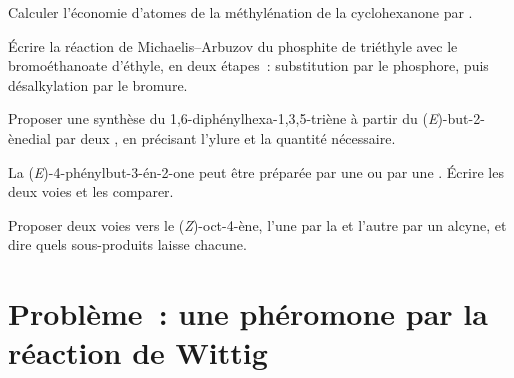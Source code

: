 \begin{exercise}[$\star\star$]\label{exo:b2:wittig:8}
Calculer l'économie d'atomes de la méthylénation de la cyclohexanone par .
\end{exercise}

\begin{exercise}[$\star\star$]\label{exo:b2:wittig:9}
Écrire la réaction de Michaelis--Arbuzov du phosphite de triéthyle avec le bromoéthanoate d'éthyle, en
deux étapes~: substitution par le phosphore, puis désalkylation par le bromure.
\end{exercise}

\begin{exercise}[$\star\star\star$]\label{exo:b2:wittig:10}
Proposer une synthèse du 1,6-diphénylhexa-1,3,5-triène à partir du (\textit{E})-but-2-ènedial
 par deux , en précisant l'ylure et la quantité nécessaire.
\end{exercise}

\begin{exercise}[$\star\star\star$]\label{exo:b2:wittig:11}
La (\textit{E})-4-phénylbut-3-én-2-one peut être préparée par une  ou par une . Écrire les deux voies et les comparer.
\end{exercise}

\begin{exercise}[$\star\star\star$]\label{exo:b2:wittig:12}
Proposer deux voies vers le (\textit{Z})-oct-4-ène, l'une par la  et l'autre par un
alcyne, et dire quels sous-produits laisse chacune.
\end{exercise}

\section{Problème~: une phéromone par la réaction de Wittig}

